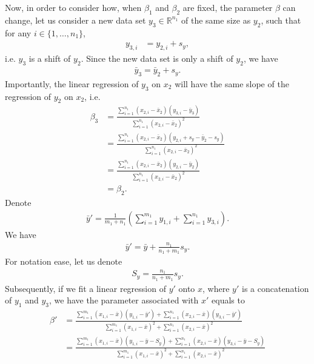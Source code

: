 \documentclass[12pt]{article}
\newcommand{\n}{n}
\newcommand{\nln}[1]{\n_{1}}
\newcommand{\m}{m}
\newcommand{\mln}[1]{\m_{1}}
\newcommand{\x}{x}
\newcommand{\y}{y}
\newcommand{\yln}[1]{y_{#1}}
\newcommand{\xln}[1]{x_{#1}}
\newcommand{\bet}{\beta}
\newcommand{\betln}[1]{\bet_{#1}}
\newcommand{\mean}[1]{ \bar{#1} }
\begin{document}
Now, in order to consider how, when $\betln{1}$ and $\betln{2}$ are fixed,
the parameter $\beta$ can change,
let us consider a new data set 
$\yln{3} \in \mathbb{R}^{\nln{1}}$ of the same size as $\yln{2}$,
such that for any $i \in \{1, \ldots, \nln{1}\}$,
\begin{align*}
	\yln{3,i} &= \yln{2,i} + s_y,
\end{align*}
i.e. $\yln{3}$ is a shift of $\yln{2}$.
Since the new data set is only a shift of $\yln{2}$,
we have
\begin{align*}
	\mean{y}_3 = \mean{y}_2 + s_y.
\end{align*}
Importantly, the linear regression of $\yln{3}$ on $\xln{2}$ will
have the same slope of the regression of $\yln{2}$
on $\xln{2}$, i.e.
\begin{align*}
	\betln{3} &= \frac{\sum_{i= 1}^{\nln{1}} ( \xln{2,i}  -  \mean{\x}_2)(\yln{3,i}  - \mean{\y}_3)}{\sum_{i=1}^{\nln{1}} (\xln{2,i} - \mean{\x}_2)^2} \\
	& = \frac{\sum_{i= 1}^{\nln{1}} (\xln{2,i} - \mean{\x}_2)(\yln{2,i} +s_y - \mean{\y}_2 -s_y)}{\sum_{i=1}^{\nln{1}} (\xln{2,i}- \mean{\x}_2)^2}\\
	& = \frac{\sum_{i= 1}^{\nln{1}} ( \xln{2,i}  -  \mean{\x}_2)(\yln{2,i}  - \mean{\y}_2)}{\sum_{i=1}^{\nln{1}} (\xln{2,i} - \mean{\x}_2)^2}\\
	& = \betln{2}.
\end{align*}
Denote 
\begin{align*}
	\mean{\y}' = \frac{1}{\mln{1} + \nln{1}} \left( \sum_{i = 1}^{\mln{1}} \yln{1,i}  + \sum_{i = 1}^{\nln{1}} \yln{3,i}  \right).
\end{align*}
We have
\begin{align*}
	\mean{\y}' = \mean{\y} + \frac{\nln{1}}{\nln{1} + \mln{1}} s_y.
\end{align*}
For notation ease, let us denote
\begin{align*}
	S_y = \frac{\nln{1}}{\nln{1} + \mln{1}} s_y.
\end{align*}
Subsequently, if we fit a linear regression of $y'$ onto $x$, where $y'$ is a concatenation of $y_1$ and $y_3$, we have the parameter
associated with $x'$ equals to
\begin{align*}
	\bet' &= \frac{\sum_{i= 1}^{\mln{1}} (\xln{1,i}  -  \mean{\x})(\yln{1,i}  - \mean{\y}') + \sum_{i= 1}^{\nln{1}} ( \xln{2,i}  -  \mean{\x})(\yln{3,i}  - \mean{\y}') }{\sum_{i=1}^{\mln{1}} (\xln{1,i} - \mean{\x})^2 + \sum_{i=1}^{\nln{1}} (\xln{2,i} - \mean{\x})^2}\\
	& = \frac{\sum_{i= 1}^{\mln{1}} (\xln{1,i}  -  \mean{\x})(\yln{1,i}  - \mean{\y} - S_y) + \sum_{i= 1}^{\nln{1}} ( \xln{2,i}  -  \mean{\x})(\yln{3,i}  - \mean{\y} - S_y) }{\sum_{i=1}^{\mln{1}} (\xln{1,i} -  \mean{\x})^2 + \sum_{i=1}^{\nln{1}} (\xln{2,i} -  \mean{\x})^2}
\end{align*}
\end{document}
